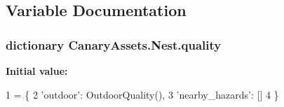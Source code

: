 \subsection{Variable Documentation}
\hypertarget{namespace_canary_assets_1_1_nest_ab47513933198fdd0489b9ad3bdb169b0}{
\subsubsection[{quality}]{\setlength{\rightskip}{0pt plus 5cm}dictionary Canary\-Assets.\-Nest.\-quality}}\label{namespace_canary_assets_1_1_nest_ab47513933198fdd0489b9ad3bdb169b0}
{\bfseries Initial value\-:}
\begin{DoxyCode}
1 = \{
2     \textcolor{stringliteral}{'outdoor'}: OutdoorQuality(),
3     \textcolor{stringliteral}{'nearby\_hazards'}: []
4 \}
\end{DoxyCode}

